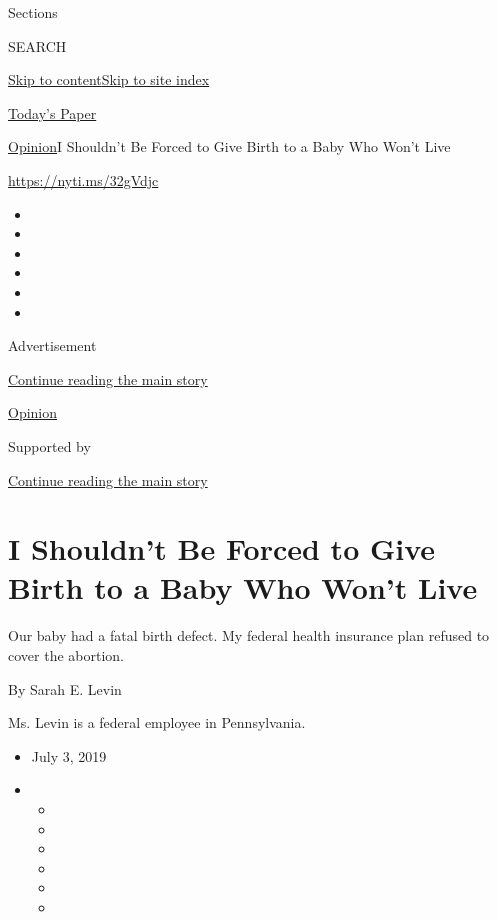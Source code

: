 Sections

SEARCH

\protect\hyperlink{site-content}{Skip to
content}\protect\hyperlink{site-index}{Skip to site index}

\href{https://myaccount.nytimes3xbfgragh.onion/auth/login?response_type=cookie\&client_id=vi}{}

\href{https://www.nytimes3xbfgragh.onion/section/todayspaper}{Today's
Paper}

\href{/section/opinion}{Opinion}\textbar{}I Shouldn't Be Forced to Give
Birth to a Baby Who Won't Live

\url{https://nyti.ms/32gVdjc}

\begin{itemize}
\item
\item
\item
\item
\item
\item
\end{itemize}

Advertisement

\protect\hyperlink{after-top}{Continue reading the main story}

\href{/section/opinion}{Opinion}

Supported by

\protect\hyperlink{after-sponsor}{Continue reading the main story}

\hypertarget{i-shouldnt-be-forced-to-give-birth-to-a-baby-who-wont-live}{%
\section{I Shouldn't Be Forced to Give Birth to a Baby Who Won't
Live}\label{i-shouldnt-be-forced-to-give-birth-to-a-baby-who-wont-live}}

Our baby had a fatal birth defect. My federal health insurance plan
refused to cover the abortion.

By Sarah E. Levin

Ms. Levin is a federal employee in Pennsylvania.

\begin{itemize}
\item
  July 3, 2019
\item
  \begin{itemize}
  \item
  \item
  \item
  \item
  \item
  \item
  \end{itemize}
\end{itemize}

